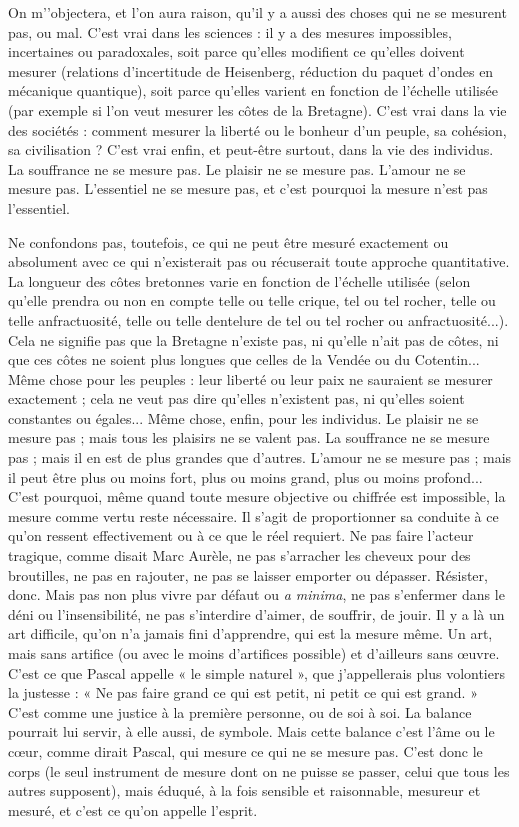 On m'’objectera, et l’on aura raison, qu’il y a aussi des choses qui ne se
mesurent pas, ou mal. C’est vrai dans les sciences : il y a des mesures impossibles,
incertaines ou paradoxales, soit parce qu’elles modifient ce qu’elles doivent
mesurer (relations d’incertitude de Heisenberg, réduction du paquet
d’ondes en mécanique quantique), soit parce qu’elles varient en fonction de
l'échelle utilisée (par exemple si l’on veut mesurer les côtes de la Bretagne).
C’est vrai dans la vie des sociétés : comment mesurer la liberté ou le bonheur
d’un peuple, sa cohésion, sa civilisation ? C’est vrai enfin, et peut-être surtout,
dans la vie des individus. La souffrance ne se mesure pas. Le plaisir ne se
mesure pas. L'amour ne se mesure pas. L'essentiel ne se mesure pas, et c’est
pourquoi la mesure n’est pas l’essentiel.

Ne confondons pas, toutefois, ce qui ne peut être mesuré exactement ou
absolument avec ce qui n’existerait pas ou récuserait toute approche quantitative.
La longueur des côtes bretonnes varie en fonction de l'échelle utilisée
(selon qu’elle prendra ou non en compte telle ou telle crique, tel ou tel rocher,
telle ou telle anfractuosité, telle ou telle dentelure de tel ou tel rocher ou anfractuosité...). Cela ne signifie pas que la Bretagne n’existe pas, ni qu’elle n’ait pas
de côtes, ni que ces côtes ne soient plus longues que celles de la Vendée ou du
Cotentin... Même chose pour les peuples : leur liberté ou leur paix ne sauraient
se mesurer exactement ; cela ne veut pas dire qu’elles n’existent pas, ni
qu’elles soient constantes ou égales... Même chose, enfin, pour les individus.
Le plaisir ne se mesure pas ; mais tous les plaisirs ne se valent pas. La souffrance
ne se mesure pas ; mais il en est de plus grandes que d’autres. L'amour ne se
mesure pas ; mais il peut être plus ou moins fort, plus ou moins grand, plus ou
moins profond... C’est pourquoi, même quand toute mesure objective ou chiffrée
est impossible, la mesure comme vertu reste nécessaire. Il s’agit de proportionner
sa conduite à ce qu’on ressent effectivement ou à ce que le réel requiert.
Ne pas faire l’acteur tragique, comme disait Marc Aurèle, ne pas s’arracher les
cheveux pour des broutilles, ne pas en rajouter, ne pas se laisser emporter ou
dépasser. Résister, donc. Mais pas non plus vivre par défaut ou {\it a minima}, ne
pas s’enfermer dans le déni ou l’insensibilité, ne pas s’interdire d’aimer, de souffrir,
de jouir. Il y a là un art difficile, qu’on n’a jamais fini d’apprendre, qui
est la mesure même. Un art, mais sans artifice (ou avec le moins d’artifices possible)
et d’ailleurs sans œuvre. C’est ce que Pascal appelle « le simple naturel »,
que j’appellerais plus volontiers la justesse : « Ne pas faire grand ce qui est petit,
ni petit ce qui est grand. » C’est comme une justice à la première personne, ou
de soi à soi. La balance pourrait lui servir, à elle aussi, de symbole. Mais cette
balance c’est l’âme ou le cœur, comme dirait Pascal, qui mesure ce qui ne se
mesure pas. C’est donc le corps (le seul instrument de mesure dont on ne
puisse se passer, celui que tous les autres supposent), mais éduqué, à la fois sensible
et raisonnable, mesureur et mesuré, et c’est ce qu’on appelle l'esprit.

